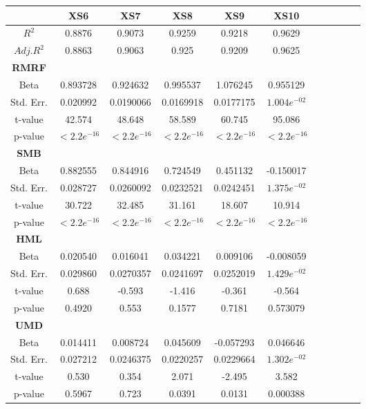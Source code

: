 \documentclass[11pt]{article}
\begin{document}
\begin{table}[H]
    \centering
    \begin{tabular}{ccccccccccc}
    \toprule\toprule
    & \textbf{XS6} & \textbf{XS7} & \textbf{XS8} & \textbf{XS9} & \textbf{XS10}\\ 
    \midrule
    $R^2$  & 0.8876 & 0.9073 & 0.9259 & 0.9218 & 0.9629 \\
    $Adj. R^2$ & 0.8863 & 0.9063 & 0.925 & 0.9209 & 0.9625 \\
    \midrule
    \textbf{RMRF} \\
    Beta & 0.893728 & 0.924632 & 0.995537 & 1.076245 & 0.955129 \\
    Std. Err. & 0.020992 & 0.0190066 & 0.0169918 & 0.0177175 & $1.004e^{-02}$ \\
    t-value & 42.574 & 48.648 & 58.589 & 60.745 &95.086 \\
    p-value & $< 2.2e^{-16}$ & $< 2.2e^{-16}$ & $< 2.2e^{-16}$ & $< 2.2e^{-16}$ & $< 2.2e^{-16}$ \\
    \midrule
    \textbf{SMB} \\
    Beta & 0.882555 & 0.844916 & 0.724549 & 0.451132 & -0.150017 \\
    Std. Err. & 0.028727 & 0.0260092 &0.0232521 & 0.0242451 & $1.375e^{-02}$ \\
    t-value & 30.722 & 32.485 & 31.161 & 18.607 & 10.914 \\
    p-value & $< 2.2e^{-16}$ & $< 2.2e^{-16}$ & $< 2.2e^{-16}$ & $< 2.2e^{-16}$ & $< 2.2e^{-16}$ \\
    \midrule
    \textbf{HML} \\
    Beta & 0.020540 & 0.016041 & 0.034221 & 0.009106 & -0.008059 \\
    Std. Err. & 0.029860 & 0.0270357 &  0.0241697 & 0.0252019 & $1.429e^{-02}$ \\
    t-value & 0.688 & -0.593 & -1.416 & -0.361 & -0.564 \\
    p-value & 0.4920 & 0.553 & 0.1577 & 0.7181 & 0.573079  \\
    \midrule
    \textbf{UMD} \\
    Beta & 0.014411 & 0.008724 & 0.045609 & -0.057293 & 0.046646 \\
    Std. Err. & 0.027212 & 0.0246375 & 0.0220257 & 0.0229664 & $1.302e^{-02}$ \\
    t-value & 0.530 & 0.354 & 2.071 & -2.495 & 3.582 \\
    p-value & 0.5967 & 0.723 & 0.0391 & 0.0131 & 0.000388 \\
    \midrule

\end{tabular}
\end{table}
\end{document}
